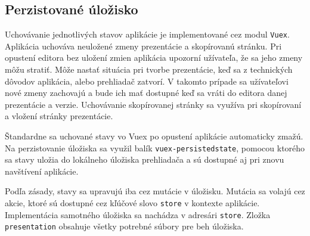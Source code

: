 \vspace{5mm}
\vspace{5mm}

\subsection{Perzistované úložisko}
\label{persistedstore}
Uchovávanie jednotlivých stavov aplikácie je implementované cez modul \texttt{Vuex}. Aplikácia uchováva neuložené zmeny prezentácie a skopírovanú stránku. Pri opustení editora bez uložení zmien aplikácia upozorní užívateľa, že sa jeho zmeny môžu stratiť. Môže nastať situácia pri tvorbe prezentácie, keď sa z technických dôvodov aplikácia, alebo prehliadač zatvorí. V takomto prípade sa užívateľovi nové zmeny zachovajú a bude ich mať dostupné keď sa vráti do editora danej prezentácie a verzie. Uchovávanie skopírovanej stránky sa využíva pri skopírovaní a vložení stránky prezentácie. 

Štandardne sa uchované stavy vo Vuex po opustení aplikácie automaticky zmažú. Na perzistovanie úložiska sa využil balík \texttt{vuex-persistedstate}, pomocou ktorého sa stavy uložia do lokálneho úložiska prehliadača a sú dostupné aj pri znovu navštívení aplikácie.

Podľa zásady, stavy sa upravujú iba cez mutácie v úložisku. Mutácia sa volajú cez akcie, ktoré sú dostupné cez kľúčové slovo \texttt{store} v kontexte aplikácie. Implementácia samotného úložiska sa nachádza v adresári \texttt{store}. Zložka \texttt{presentation} obsahuje všetky potrebné súbory pre beh úložiska.

